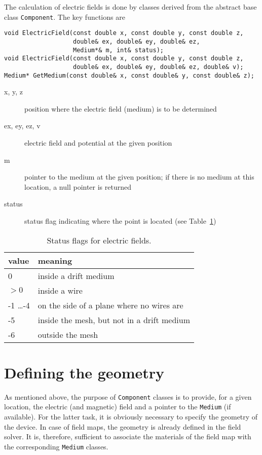 The calculation of electric fields is done by classes 
derived from the abstract base class \texttt{Component}. 
The key functions are 
\begin{lstlisting}
void ElectricField(const double x, const double y, const double z,
                   double& ex, double& ey, double& ez,
                   Medium*& m, int& status);
void ElectricField(const double x, const double y, const double z,
                   double& ex, double& ey, double& ez, double& v);
Medium* GetMedium(const double& x, const double& y, const double& z);
\end{lstlisting}
\begin{description}
  \item[x, y, z] 
  position where the electric field (medium) is to be determined
  \item[ex, ey, ez, v] 
  electric field and potential at the given position
  \item[m] pointer to the medium at the given position; 
  if there is no medium at this location, a null pointer is returned
  \item[status] status flag indicating where the point is located
  (see Table~\ref{Tab:StatusFlagsField})
\end{description}

\begin{table} 
  \centering
  \begin{tabular}{l l}
  \toprule
  value & meaning \\
  \midrule
    0   & inside a drift medium \\
  \(> 0\) & inside a wire \\
   -1 \dots -4  &  on the side of a plane where no wires are \\
   -5   & inside the mesh, but not in a drift medium \\
   -6   & outside the mesh \\
  \bottomrule
  \end{tabular}
  \caption{Status flags for electric fields.}
  \label{Tab:StatusFlagsField}
\end{table}

\section{Defining the geometry}

As mentioned above, the purpose of \texttt{Component} classes is to 
provide, for a given location, the electric (and magnetic) field and a pointer to the 
\texttt{Medium} (if available).
For the latter task, it is obviously necessary to specify the geometry 
of the device. 
In case of field maps, the geometry is already defined in the field solver. 
It is, therefore, sufficient to associate the materials 
of the field map with the corresponding \texttt{Medium} classes. 

